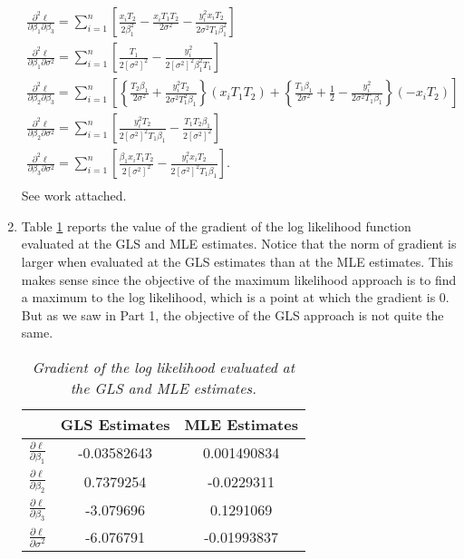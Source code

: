 \documentclass[12pt]{article}
\begin{document}
\begin{enumerate}
\[\begin{array}{ll}
        \frac{\partial^2 \ell}{\partial \beta_1 \partial \beta_3} = \sum_{i=1}^{n}\left[ \frac{x_iT_2}{2\beta_1^2} - \frac{x_iT_1T_2}{2\sigma^2} -
        \frac{y_i^2x_iT_2}{2\sigma^2T_1\beta_1^2} \right] & \\ 
        \frac{\partial^2 \ell}{\partial \beta_1 \partial \sigma^2} = \sum_{i=1}^{n}\left[ \frac{T_1}{2[\sigma^2]^2} -
        \frac{y_i^2}{2[\sigma^2]^2\beta_1^2T_1} \right] & \\ 
        \frac{\partial^2 \ell}{\partial \beta_2 \partial \beta_3} = \sum_{i=1}^{n}\left[ \left\{ \frac{T_2\beta_1}{2\sigma^2} +
          \frac{y_i^2T_2}{2\sigma^2T_1^2\beta_1} \right\}(x_iT_1T_2) + \left\{ \frac{T_1\beta_1}{2\sigma^2} + \frac{1}{2} -
        \frac{y_i^2}{2\sigma^2T_1\beta_1} \right\}(-x_iT_2) \right] & \\ 
        \frac{\partial^2 \ell}{\partial \beta_2 \partial \sigma^2} = \sum_{i=1}^{n}\left[ \frac{y_i^2T_2}{2[\sigma^2]^2T_1\beta_1} -
        \frac{T_1T_2\beta_1}{2[\sigma^2]^2} \right] & \\ 
        \frac{\partial^2 \ell}{\partial \beta_3 \partial \sigma^2} = \sum_{i=1}^{n}\left[ \frac{\beta_1x_iT_1T_2}{2[\sigma^2]^2} -
        \frac{y_i^2x_iT_2}{2[\sigma^2]^2T_1\beta_1} \right]. & \\
      \end{array}
    \]
    See work attached.

    \newpage

  \item Table \ref{tab5.1} reports the value of the gradient of the log likelihood function evaluated at the GLS and MLE estimates.
    Notice that the norm of gradient is larger when evaluated at the GLS estimates than at the MLE estimates. This makes sense since the objective 
    of the maximum likelihood approach is to find a maximum to the log likelihood, which is a point at which the gradient is 0. But as we saw in Part 1, the objective
    of the GLS approach is not quite the same.

    \begin{table}[h]
      \caption{\emph{Gradient of the log likelihood evaluated at the GLS and MLE estimates.}}
      \vspace{.2cm}
      \centering
      \begin{tabular}{|c|c|c|}
        \hline
        & GLS Estimates & MLE Estimates \\
        \hline
        $\frac{\partial \ell}{\partial \beta_1}$ & -0.03582643 & 0.001490834 \\
        \hline
        $\frac{\partial \ell}{\partial \beta_2}$ & 0.7379254 & -0.0229311 \\
        \hline
        $\frac{\partial \ell}{\partial \beta_3}$ & -3.079696 & 0.1291069 \\
        \hline
        $\frac{\partial \ell}{\partial \sigma^{2}}$ & -6.076791 & -0.01993837 \\
        \hline
      \end{tabular}
      \label{tab5.1}
    \end{table}



\end{enumerate}
\end{document}
